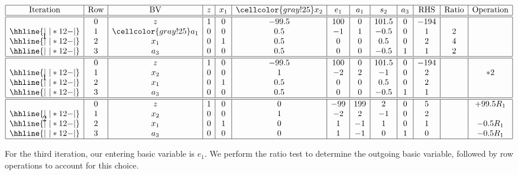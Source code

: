 \documentclass[12pt]{article}
\theoremstyle{definition}
\begin{document}
\[\begin{array}{*{13}{|c}|}
    \hline
    \text{Iteration} & \text{Row} & \text{BV}
        & z & x_1 & \cellcolor{gray!25}x_2 & e_1 & a_1 & s_2 & a_3
        &\text{RHS} & \text{Ratio} & \text{Operation} \\\hline\hline
    \multirow{4}*{1}
    & 0 & z   & 1 & 0 & -99.5 & 100 & 0 & 101.5 & 0  & -194 & & \\\hhline{|~|*{12}{-}|}
    & 1 & \cellcolor{gray!25}a_1 & 0 & 0  & 0.5  & -1 & 1 & -0.5 & 0 & 1 & 2 & \\\hhline{|~|*{12}{-}|}
    & 2 & x_1 & 0 & 1  & 0.5  & 0 & 0 & 0.5 & 0 & 2 & 4 &  \\\hhline{|~|*{12}{-}|}
    & 3 & a_3 & 0 & 0  & 0.5  & 0 & 0 & -0.5 & 1 & 1 & 2 & \\\hline
    \hline
    \multirow{4}*{1}
    & 0 & z   & 1 & 0 & -99.5 & 100 & 0 & 101.5 & 0  & -194 & & \\\hhline{|~|*{12}{-}|}
    & 1 & x_2 & 0 & 0  & 1  & -2 & 2 & -1 & 0 & 2 &  & *2 \\\hhline{|~|*{12}{-}|}
    & 2 & x_1 & 0 & 1  & 0.5  & 0 & 0 & 0.5 & 0 & 2 &  &  \\\hhline{|~|*{12}{-}|}
    & 3 & a_3 & 0 & 0  & 0.5  & 0 & 0 & -0.5 & 1 & 1 &  & \\\hline
    \hline
    \multirow{4}*{2}
    & 0 & z   & 1 & 0 & 0 & -99 & 199 & 2 & 0  & 5 & & +99.5R_1 \\\hhline{|~|*{12}{-}|}
    & 1 & x_2 & 0 & 0  & 1  & -2 & 2 & -1 & 0 & 2 &  &  \\\hhline{|~|*{12}{-}|}
    & 2 & x_1 & 0 & 1  & 0 & 1 & -1 & 1 & 0 & 1 &  & -0.5R_1 \\\hhline{|~|*{12}{-}|}
    & 3 & a_3 & 0 & 0  & 0  & 1 & -1 & 0 & 1 & 0 & & -0.5R_1 \\\hline
\end{array}\]

 For the third iteration, our entering basic variable is $e_1$. We perform the ratio test to determine the outgoing basic variable, followed by row operations to account for this choice.
 
\end{document}
